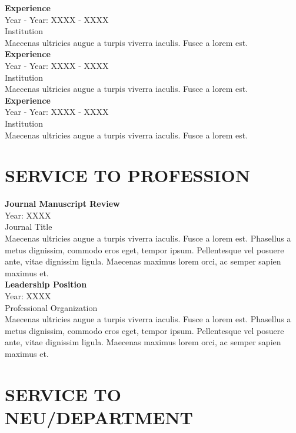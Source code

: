 \documentclass[a4paper,9pt]{extarticle}
\begin{document}
\noindent
\newline
\textbf{Experience} \\
Year - Year: XXXX - XXXX \\
Institution\\
Maecenas ultricies augue a turpis viverra iaculis. Fusce a lorem est. \\

\noindent
\textbf{Experience} \\
Year - Year: XXXX - XXXX \\
Institution\\
Maecenas ultricies augue a turpis viverra iaculis. Fusce a lorem est. \\

\noindent
\textbf{Experience} \\
Year - Year: XXXX - XXXX \\
Institution\\
Maecenas ultricies augue a turpis viverra iaculis. Fusce a lorem est.


\section*{SERVICE TO PROFESSION}

\noindent
\newline
\textbf{Journal Manuscript Review} \\
Year: XXXX \\
Journal Title \\
Maecenas ultricies augue a turpis viverra iaculis. Fusce a lorem est. Phasellus a metus dignissim, commodo eros eget, tempor ipsum. Pellentesque vel posuere ante, vitae dignissim ligula. Maecenas maximus lorem orci, ac semper sapien maximus et. \\

\noindent
\textbf{Leadership Position} \\
Year: XXXX \\
Professional Organization \\
Maecenas ultricies augue a turpis viverra iaculis. Fusce a lorem est. Phasellus a metus dignissim, commodo eros eget, tempor ipsum. Pellentesque vel posuere ante, vitae dignissim ligula. Maecenas maximus lorem orci, ac semper sapien maximus et. 


\section*{SERVICE TO NEU/DEPARTMENT}
\end{document}
